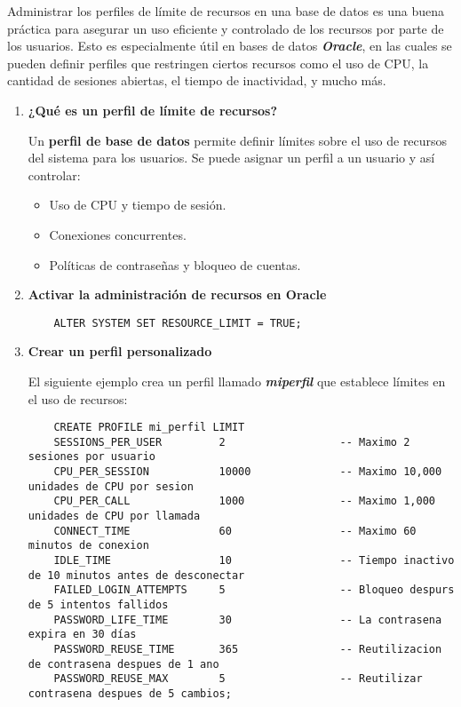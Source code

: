 Administrar los perfiles de límite de recursos en una base de datos es una buena práctica para asegurar un uso eficiente y controlado de los recursos por parte de los usuarios. Esto es especialmente útil en bases de datos \textbf{\emph{Oracle}}, en las cuales se pueden definir perfiles que restringen ciertos recursos como el uso de CPU, la cantidad de sesiones abiertas, el tiempo de inactividad, y mucho más.

\begin{enumerate}
  \item \textbf{¿Qué es un perfil de límite de recursos?}
  
  Un \textbf{perfil de base de datos} permite definir límites sobre el uso de recursos del sistema para los usuarios. Se puede asignar un perfil a un usuario y así controlar:

  \begin{itemize}
    \item Uso de CPU y tiempo de sesión.
    \item Conexiones concurrentes.
    \item Políticas de contraseñas y bloqueo de cuentas.
  \end{itemize}

  \item \textbf{Activar la administración de recursos en Oracle}
  
  \begin{lstlisting}
    ALTER SYSTEM SET RESOURCE_LIMIT = TRUE;
  \end{lstlisting}

  \item \textbf{Crear un perfil personalizado}
  
  El siguiente ejemplo crea un perfil llamado \textbf{\emph{mi{\textunderscore}perfil}} que establece límites en el uso de recursos:

  \begin{lstlisting}
    CREATE PROFILE mi_perfil LIMIT
    SESSIONS_PER_USER         2                  -- Maximo 2 sesiones por usuario
    CPU_PER_SESSION           10000              -- Maximo 10,000 unidades de CPU por sesion
    CPU_PER_CALL              1000               -- Maximo 1,000 unidades de CPU por llamada
    CONNECT_TIME              60                 -- Maximo 60 minutos de conexion
    IDLE_TIME                 10                 -- Tiempo inactivo de 10 minutos antes de desconectar
    FAILED_LOGIN_ATTEMPTS     5                  -- Bloqueo despurs de 5 intentos fallidos
    PASSWORD_LIFE_TIME        30                 -- La contrasena expira en 30 días
    PASSWORD_REUSE_TIME       365                -- Reutilizacion de contrasena despues de 1 ano
    PASSWORD_REUSE_MAX        5                  -- Reutilizar contrasena despues de 5 cambios;
  \end{lstlisting}


\end{enumerate}

